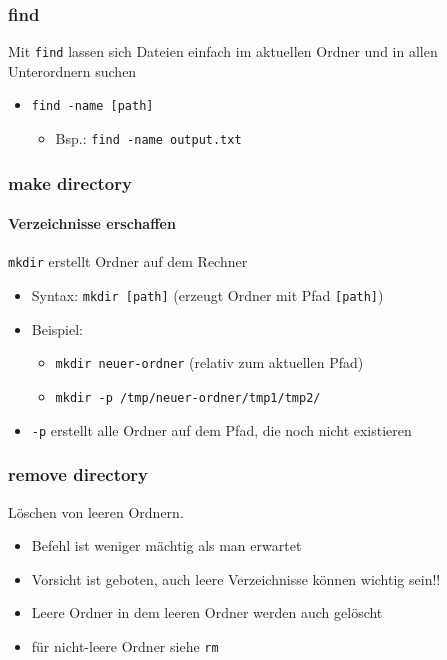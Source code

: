 \documentclass[12pt,utf8]{beamer}
\begin{document}
\begin{frame}
	\frametitle{find}
	Mit \texttt{find} lassen sich Dateien einfach im aktuellen Ordner und in allen Unterordnern suchen
	\begin{itemize}
		\item \texttt{find -name [path]}
		\begin{itemize}[<+->]
			\item Bsp.: \texttt{find -name output.txt}
		\end{itemize}
	\end{itemize}
\end{frame}

\begin{frame}
\frametitle{make directory}
\framesubtitle{Verzeichnisse erschaffen}
\texttt{mkdir} erstellt Ordner auf dem Rechner
\begin{itemize}
	\item Syntax: \texttt{mkdir [path]}   (erzeugt Ordner mit Pfad \texttt{[path]})
	\item Beispiel:
	\begin{itemize}[<+->]
		\item \texttt{mkdir neuer-ordner}    (relativ zum aktuellen Pfad)
		\item \texttt{mkdir -p /tmp/neuer-ordner/tmp1/tmp2/}
	\end{itemize}
	\item \texttt{-p}   erstellt alle Ordner auf dem Pfad, die noch nicht existieren
\end{itemize}
\end{frame}

\begin{frame}
\frametitle{remove directory}
Löschen von leeren Ordnern.
\begin{itemize}
	\item Befehl ist weniger mächtig als man erwartet
	\item Vorsicht ist geboten, auch leere Verzeichnisse können wichtig sein!!
	\item Leere Ordner in dem leeren Ordner werden auch gelöscht
	\item für nicht-leere Ordner siehe \texttt{rm}
\end{itemize}
\end{frame}
\end{document}
